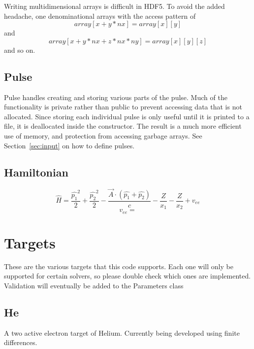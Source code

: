 \documentclass{article}
\begin{document}
Writing multidimensional arrays is difficult in HDF5. To avoid the added headache, one denominational arrays with the access pattern of
\begin{equation}
	array[x+y*nx] = array[x][y]
\end{equation}
and
\begin{equation}
	array[x+y*nx+z*nx*ny] = array[x][y][z]
\end{equation}
and so on.

\subsection{Pulse} %
\label{sub:pulse}
Pulse handles creating and storing various parts of the pulse. Much of the functionality is private rather than public to prevent accessing data that is not allocated. Since storing each individual pulse is only useful until it is printed to a file, it is deallocated inside the constructor. The result is a much more efficient use of memory, and protection from accessing garbage arrays. See Section~\ref{sec:input} on how to define pulses.

\subsection{Hamiltonian} %
\label{sub:hamiltonian}
\begin{equation}
	\hat H = \frac{\hat{p_1}^2}{2} + \frac{\hat{p_2}^2}{2} - \frac{\vec{A} \cdot (\hat{p_1}+\hat{p_2})}{c} - \frac{Z}{x_1} - \frac{Z}{x_2} + v_{ee}
\end{equation}
\begin{equation}
	v_{ee} = 
\end{equation}


\section{Targets} %
\label{sec:targets}
These are the various targets that this code supports. Each one will only be supported for certain solvers, so please double check which ones are implemented. Validation will eventually be added to the Parameters class
\subsection{He} %
\label{sub:he}
A two active electron target of Helium. Currently being developed using finite differences.
\end{document}
